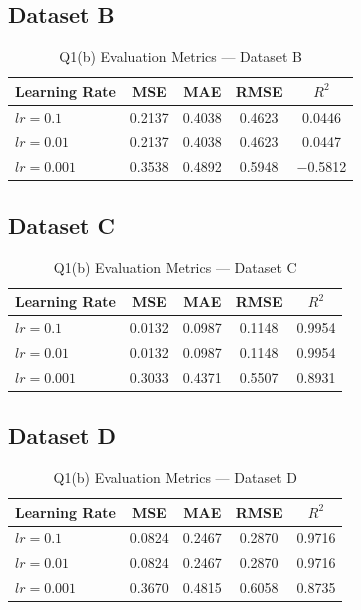 \documentclass{article}
\begin{document}
\subsection{Dataset B}
\begin{table}[H]\centering
\begin{tabular}{lcccc}\toprule
\textbf{Learning Rate} & \textbf{MSE} & \textbf{MAE} & \textbf{RMSE} & $R^2$ \\\midrule
$lr=0.1$   & 0.2137 & 0.4038 & 0.4623 & 0.0446 \\
$lr=0.01$  & 0.2137 & 0.4038 & 0.4623 & 0.0447 \\
$lr=0.001$ & 0.3538 & 0.4892 & 0.5948 & $-$0.5812 \\
\bottomrule\end{tabular}
\caption{Q1(b) Evaluation Metrics --- Dataset B}
\end{table}

\subsection{Dataset C}
\begin{table}[H]\centering
\begin{tabular}{lcccc}\toprule
\textbf{Learning Rate} & \textbf{MSE} & \textbf{MAE} & \textbf{RMSE} & $R^2$ \\\midrule
$lr=0.1$   & 0.0132 & 0.0987 & 0.1148 & 0.9954 \\
$lr=0.01$  & 0.0132 & 0.0987 & 0.1148 & 0.9954 \\
$lr=0.001$ & 0.3033 & 0.4371 & 0.5507 & 0.8931 \\
\bottomrule\end{tabular}
\caption{Q1(b) Evaluation Metrics --- Dataset C}
\end{table}

\subsection{Dataset D}
\begin{table}[H]\centering
\begin{tabular}{lcccc}\toprule
\textbf{Learning Rate} & \textbf{MSE} & \textbf{MAE} & \textbf{RMSE} & $R^2$ \\\midrule
$lr=0.1$   & 0.0824 & 0.2467 & 0.2870 & 0.9716 \\
$lr=0.01$  & 0.0824 & 0.2467 & 0.2870 & 0.9716 \\
$lr=0.001$ & 0.3670 & 0.4815 & 0.6058 & 0.8735 \\
\bottomrule\end{tabular}
\caption{Q1(b) Evaluation Metrics --- Dataset D}
\end{table}
\end{document}

